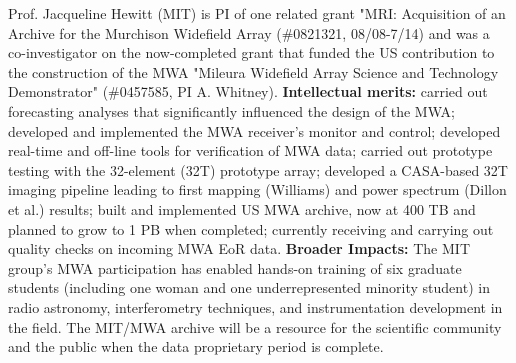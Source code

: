 \documentclass[12pt,preprint]{aastex}
\begin{document}
Prof. Jacqueline Hewitt (MIT) is PI of one related grant "MRI:  Acquisition of
an Archive for the Murchison Widefield Array (\#0821321, 08/08-7/14) and was a
co-investigator on the now-completed grant that funded the US contribution to the construction
of the MWA "Mileura Widefield Array Science and Technology Demonstrator" 
(\#0457585, PI A. Whitney).  {\bf Intellectual merits:} carried out forecasting analyses that
significantly influenced the design of the MWA; developed and implemented the MWA
receiver's monitor and control; developed real-time and off-line tools for verification of MWA data; 
carried out prototype testing with the 32-element (32T) prototype array; developed a 
CASA-based 32T imaging pipeline leading to first mapping (Williams) and power spectrum
(Dillon et al.) results;  built and implemented US MWA archive, now at 400 TB and planned
to grow to 1 PB when completed; currently receiving and carrying out quality
checks on incoming MWA EoR data. {\bf Broader Impacts:}  The MIT group's MWA participation
has enabled hands-on training of six graduate students (including one woman and
one underrepresented minority student) in radio astronomy,
interferometry techniques, and instrumentation development in the field. 
The MIT/MWA archive will be a resource for the scientific community and the
public when the data proprietary period is complete.
\end{document}
